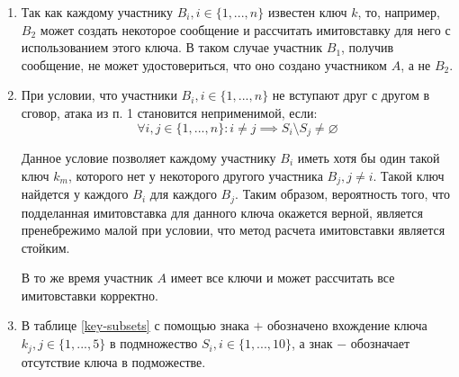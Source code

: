 \documentclass[12pt, a4paper]{extarticle}
\begin{document}
\begin{enumerate}
    \item Так как каждому участнику $B_i, i \in \{1, ..., n\}$ известен ключ $k$, то, например, $B_2$ может создать 
        некоторое сообщение и рассчитать имитовставку для него с использованием этого ключа. В таком случае участник
        $B_1$, получив сообщение, не может удостовериться, что оно создано участником $A$, а не $B_2$.
        
    \item При условии, что участники $B_i, i \in \{1, ..., n\}$ не вступают друг с другом в сговор, атака из п. 1
        становится неприменимой, если:
        \begin{equation}
            \forall i,j \in \{1,...,n\} : i \ne j \implies S_i \setminus S_j \ne \varnothing
            \label{6.2-condition}
        \end{equation}
        
        Данное условие позволяет каждому участнику $B_i$ иметь хотя бы один такой ключ $k_m$, которого нет у некоторого
        другого участника $B_j, j \ne i$. Такой ключ найдется у каждого $B_i$ для каждого $B_j$. Таким образом, вероятность
        того, что подделанная имитовставка для данного ключа окажется верной, является пренебрежимо малой при условии, что
        метод расчета имитовставки является стойким.
        
        В то же время участник $A$ имеет все ключи и может рассчитать все имитовставки корректно.
        
    \item В таблице \ref{key-subsets} с помощью знака $+$ обозначено вхождение ключа $k_j, j \in \{1, ..., 5\}$ в подмножество
        $S_i, i \in \{1, ..., 10\}$, а знак $-$ обозначает отсутствие ключа в подможестве.
        

\end{enumerate}
\end{document}
